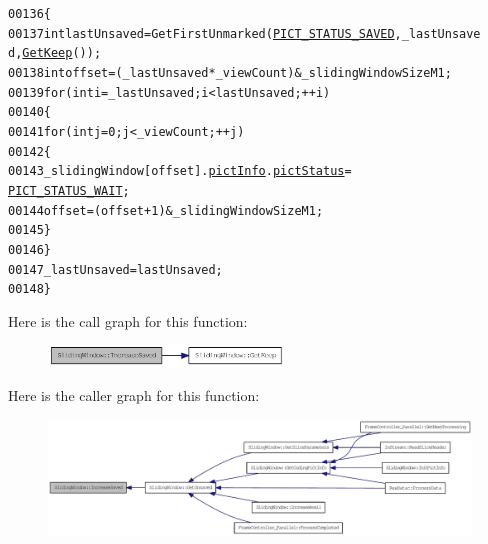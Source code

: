 \begin{footnotesize}\begin{alltt}
00136         \{
00137                 \textcolor{keywordtype}{int} lastUnsaved = GetFirstUnmarked(\hyperlink{_picture_info_8h_a81f2be9d3984eb16fa6f3b7daf46466f}{PICT_STATUS_SAVED}, \_lastUnsave
      d, \hyperlink{class_sliding_window_a0aafbf41ff2b7bb6c32fb60075bfeb22}{GetKeep}());
00138                 \textcolor{keywordtype}{int} offset = (\_lastUnsaved * \_viewCount) & \_slidingWindowSizeM1;
00139                 \textcolor{keywordflow}{for} (\textcolor{keywordtype}{int} i = \_lastUnsaved; i < lastUnsaved; ++i)
00140                 \{
00141                         \textcolor{keywordflow}{for} (\textcolor{keywordtype}{int} j = 0; j < \_viewCount; ++j)
00142                         \{
00143                                 \_slidingWindow[offset].\hyperlink{structtag_sliding_item_a3d1f87274664505c5fb9fe06d3cd16d3}{pictInfo}.\hyperlink{struct_coding_pict_info_a41498e5ba764405481005e6569d7f728}{pictStatus} = 
      \hyperlink{_picture_info_8h_ac2f16d038f94c6c57ed8648c6cfe3bb7}{PICT_STATUS_WAIT};
00144                                 offset = (offset + 1) & \_slidingWindowSizeM1;
00145                         \}
00146                 \}
00147                 \_lastUnsaved = lastUnsaved;
00148         \}
\end{alltt}\end{footnotesize}




Here is the call graph for this function:\nopagebreak
\begin{figure}[H]
\begin{center}
\leavevmode
\includegraphics[width=178pt]{class_sliding_window_aea027ce6f77dcee09d1aafb31d5732c5_cgraph}
\end{center}
\end{figure}




Here is the caller graph for this function:\nopagebreak
\begin{figure}[H]
\begin{center}
\leavevmode
\includegraphics[width=420pt]{class_sliding_window_aea027ce6f77dcee09d1aafb31d5732c5_icgraph}
\end{center}
\end{figure}


